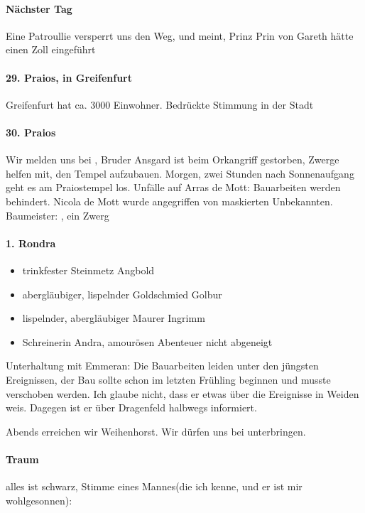 \paragraph{Nächster Tag}
Eine Patroullie versperrt uns den Weg, und meint, Prinz Prin von Gareth hätte einen Zoll eingeführt

\paragraph{29. Praios, in Greifenfurt}Greifenfurt hat ca. 3000 Einwohner. Bedrückte Stimmung in der Stadt

\paragraph{30. Praios} Wir melden uns bei , Bruder Ansgard ist beim Orkangriff gestorben, Zwerge helfen mit, den Tempel aufzubauen. Morgen, zwei Stunden nach Sonnenaufgang geht es am Praiostempel los. Unfälle auf Arras de Mott: Bauarbeiten werden behindert. Nicola de Mott wurde angegriffen von maskierten Unbekannten. Baumeister: , ein Zwerg  

\paragraph{1. Rondra}

\begin{itemize}
\item trinkfester Steinmetz Angbold
\item abergläubiger, lispelnder Goldschmied Golbur
\item lispelnder, abergläubiger Maurer Ingrimm
\item Schreinerin Andra, amourösen Abenteuer nicht abgeneigt
\end{itemize}
Unterhaltung mit Emmeran: Die Bauarbeiten leiden unter den jüngsten Ereignissen, der Bau sollte schon im letzten Frühling beginnen und musste verschoben werden. Ich glaube nicht, dass er etwas über die Ereignisse in Weiden weis. Dagegen ist er über Dragenfeld halbwegs informiert.

Abends erreichen wir Weihenhorst. Wir dürfen uns bei  unterbringen. 

\paragraph{Traum}alles ist schwarz, Stimme eines Mannes(die ich kenne, und er ist mir wohlgesonnen):  

